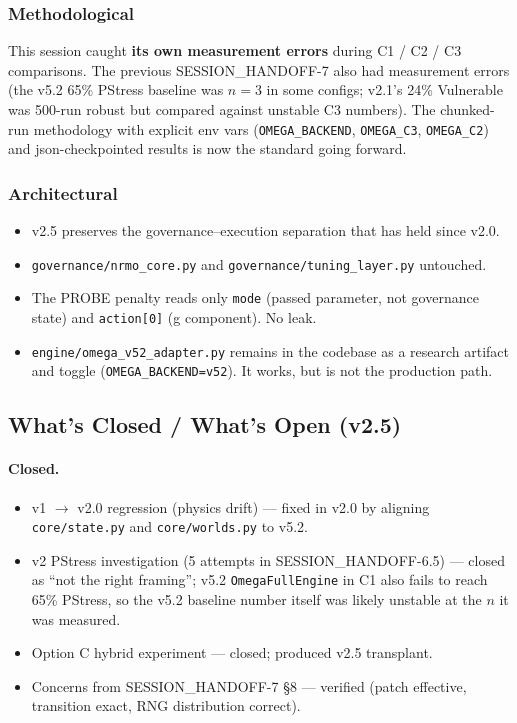 \subsubsection{Methodological}

This session caught \textbf{its own measurement errors} during
C1 / C2 / C3 comparisons. The previous SESSION\_HANDOFF-7 also had
measurement errors (the v5.2 65\% PStress baseline was $n = 3$ in
some configs; v2.1's 24\% Vulnerable was 500-run robust but compared
against unstable C3 numbers). The chunked-run methodology with
explicit env vars (\texttt{OMEGA\_BACKEND}, \texttt{OMEGA\_C3},
\texttt{OMEGA\_C2}) and json-checkpointed results is now the
standard going forward.

\subsubsection{Architectural}

\begin{itemize}
\item v2.5 preserves the governance--execution separation that has
held since v2.0.
\item \texttt{governance/nrmo\_core.py} and
\texttt{governance/tuning\_layer.py} untouched.
\item The PROBE penalty reads only \texttt{mode} (passed parameter,
not governance state) and \texttt{action[0]} (g component). No
leak.
\item \texttt{engine/omega\_v52\_adapter.py} remains in the codebase
as a research artifact and toggle (\texttt{OMEGA\_BACKEND=v52}).
It works, but is not the production path.
\end{itemize}

\subsection{What's Closed / What's Open (v2.5)}
\label{sec:methodology-v25-closed-open}

\paragraph{Closed.}

\begin{itemize}
\item v1 $\to$ v2.0 regression (physics drift) --- fixed in v2.0 by
aligning \texttt{core/state.py} and \texttt{core/worlds.py} to v5.2.
\item v2 PStress investigation (5 attempts in
SESSION\_HANDOFF-6.5) --- closed as ``not the right framing''; v5.2
\texttt{OmegaFullEngine} in C1 also fails to reach 65\% PStress, so
the v5.2 baseline number itself was likely unstable at the $n$ it
was measured.
\item Option C hybrid experiment --- closed; produced v2.5
transplant.
\item Concerns from SESSION\_HANDOFF-7 \S 8 --- verified (patch
effective, transition exact, RNG distribution correct).
\end{itemize}

